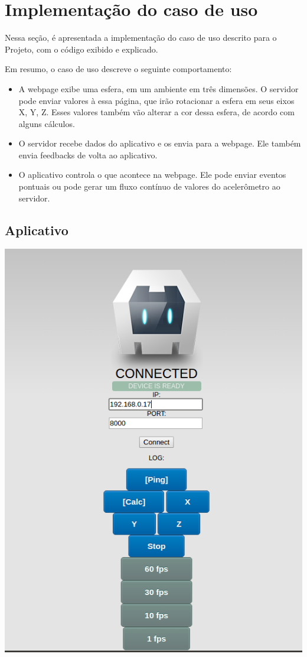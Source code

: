 \documentclass[a4paper,12pt]{article}
\begin{document}
\newpage
\section{Implementação do caso de uso}

Nessa seção, é apresentada a implementação do caso de uso descrito para o Projeto, com o código exibido e explicado.

Em resumo, o caso de uso descreve o seguinte comportamento:

\begin{itemize}
    \item A webpage exibe uma esfera, em um ambiente em três dimensões. O servidor pode enviar valores à essa página, que irão rotacionar a esfera em seus eixos X, Y, Z. Esses valores também vão alterar a cor dessa esfera, de acordo com alguns cálculos.

    \item O servidor recebe dados do aplicativo e os envia para a webpage. Ele também envia feedbacks de volta ao aplicativo.

    \item O aplicativo controla o que acontece na webpage. Ele pode enviar eventos pontuais ou pode gerar um fluxo contínuo de valores do acelerômetro ao servidor.
\end{itemize}


\newpage
\subsection{Aplicativo}

\includegraphics[width=1\linewidth]{images/Cordova.png}
\newpage
\end{document}
